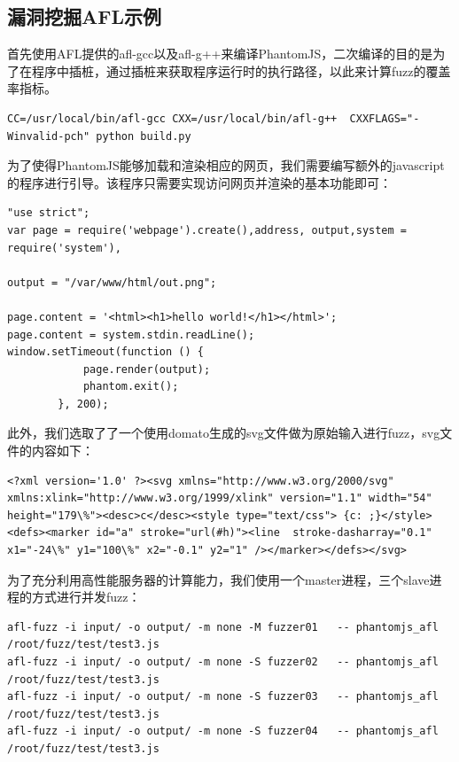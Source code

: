 \documentclass[doctor,privacy,twoside]{buaa_mac}
\begin{document}
\subsection{漏洞挖掘AFL示例}
首先使用AFL提供的afl-gcc以及afl-g++来编译PhantomJS，二次编译的目的是为了在程序中插桩，通过插桩来获取程序运行时的执行路径，以此来计算fuzz的覆盖率指标。

\lstset{language=JavaScript}
\begin{lstlisting}
CC=/usr/local/bin/afl-gcc CXX=/usr/local/bin/afl-g++  CXXFLAGS="-Winvalid-pch" python build.py
\end{lstlisting}

为了使得PhantomJS能够加载和渲染相应的网页，我们需要编写额外的javascript的程序进行引导。该程序只需要实现访问网页并渲染的基本功能即可：

\lstset{language=JavaScript}
\begin{lstlisting}
"use strict";
var page = require('webpage').create(),address, output,system = require('system'),

output = "/var/www/html/out.png";

page.content = '<html><h1>hello world!</h1></html>';
page.content = system.stdin.readLine();
window.setTimeout(function () {
            page.render(output);
            phantom.exit();
        }, 200);
\end{lstlisting}

此外，我们选取了了一个使用domato生成的svg文件做为原始输入进行fuzz，svg文件的内容如下：
\lstset{language=JavaScript}
\begin{lstlisting}
<?xml version='1.0' ?><svg xmlns="http://www.w3.org/2000/svg" xmlns:xlink="http://www.w3.org/1999/xlink" version="1.1" width="54" height="179\%"><desc>c</desc><style type="text/css"> {c: ;}</style><defs><marker id="a" stroke="url(#h)"><line  stroke-dasharray="0.1" x1="-24\%" y1="100\%" x2="-0.1" y2="1" /></marker></defs></svg>
\end{lstlisting}

为了充分利用高性能服务器的计算能力，我们使用一个master进程，三个slave进程的方式进行并发fuzz：

\lstset{language=JavaScript}
\begin{lstlisting}
afl-fuzz -i input/ -o output/ -m none -M fuzzer01   -- phantomjs_afl /root/fuzz/test/test3.js
afl-fuzz -i input/ -o output/ -m none -S fuzzer02   -- phantomjs_afl /root/fuzz/test/test3.js
afl-fuzz -i input/ -o output/ -m none -S fuzzer03   -- phantomjs_afl /root/fuzz/test/test3.js
afl-fuzz -i input/ -o output/ -m none -S fuzzer04   -- phantomjs_afl /root/fuzz/test/test3.js
\end{lstlisting}
\end{document}
